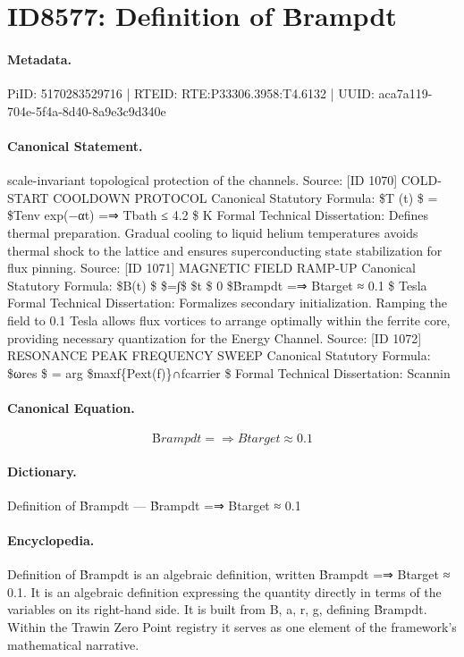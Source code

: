 \section*{ID8577: Definition of Ḃrampdt}
\paragraph{Metadata.}
PiID: 5170283529716 | RTEID: RTE:P33306.3958:T4.6132 | UUID: aca7a119-704e-5f4a-8d40-8a9e3c9d340e

\paragraph{Canonical Statement.}
scale-invariant topological protection of the channels. Source: [ID 1070] COLD-START COOLDOWN PROTOCOL Canonical Statutory Formula: \$T (t) \$ = \$Tenv exp(−αt) =⇒ Tbath ≤ 4.2 \$ K Formal Technical Dissertation: Defines thermal preparation. Gradual cooling to liquid helium temperatures avoids thermal shock to the lattice and ensures superconducting state stabilization for flux pinning. Source: [ID 1071] MAGNETIC FIELD RAMP-UP Canonical Statutory Formula: \$B(t) \$ \$=∫\$ \$t \$ 0 \$Ḃrampdt =⇒ Btarget ≈ 0.1 \$ Tesla Formal Technical Dissertation: Formalizes secondary initialization. Ramping the field to 0.1 Tesla allows flux vortices to arrange optimally within the ferrite core, providing necessary quantization for the Energy Channel. Source: [ID 1072] RESONANCE PEAK FREQUENCY SWEEP Canonical Statutory Formula: \$ωres \$ = arg \$maxf\{Pext(f)\}∩fcarrier \$ Formal Technical Dissertation: Scannin

\paragraph{Canonical Equation.}
\[
Ḃrampdt =⇒ Btarget ≈ 0.1
\]

\paragraph{Dictionary.}
Definition of Ḃrampdt — Ḃrampdt =⇒ Btarget ≈ 0.1

\paragraph{Encyclopedia.}
Definition of Ḃrampdt is an algebraic definition, written Ḃrampdt =⇒ Btarget ≈ 0.1. It is an algebraic definition expressing the quantity directly in terms of the variables on its right-hand side. It is built from B, a, r, g, defining Ḃrampdt. Within the Trawin Zero Point registry it serves as one element of the framework's mathematical narrative.
